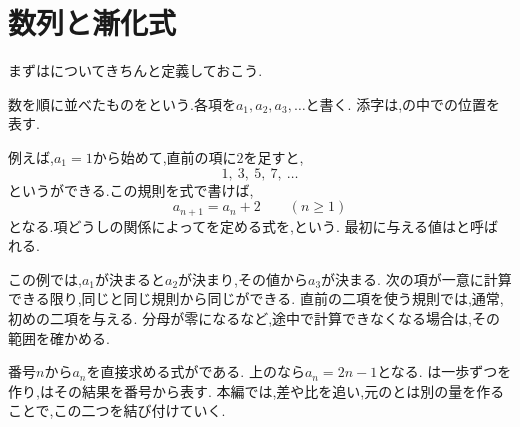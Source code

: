 \section{数列と漸化式}\label{節：数列と漸化式}
  まずはについてきちんと定義しておこう.

数を順に並べたものをという.各項を$a_1,a_2,a_3,\ldots$と書く.
添字は,の中での位置を表す.

例えば,$a_1=1$から始めて,直前の項に$2$を足すと,
\[
  1,\ 3,\ 5,\ 7,\ \ldots
\]
というができる.この規則を式で書けば,
\[
  a_{n+1}=a_n+2\qquad(n\ge1)
\]
となる.項どうしの関係によってを定める式を,という.
最初に与える値はと呼ばれる.

この例では,$a_1$が決まると$a_2$が決まり,その値から$a_3$が決まる.
次の項が一意に計算できる限り,同じと同じ規則から同じができる.
直前の二項を使う規則では,通常,初めの二項を与える.
分母が零になるなど,途中で計算できなくなる場合は,その範囲を確かめる.

番号$n$から$a_n$を直接求める式がである.
上のなら$a_n=2n-1$となる.
は一歩ずつを作り,はその結果を番号から表す.
本編では,差や比を追い,元のとは別の量を作ることで,この二つを結び付けていく.
